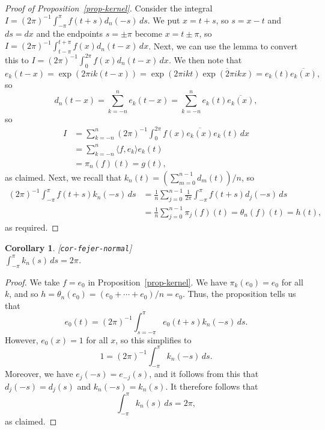 \documentclass{amsart}
\newcommand{\lbl}[1]{\label{#1}\textup{[\texttt{#1}]}\ \\}
\newcommand{\lbl}{\label}
\newcommand{\tht}       {\theta}
\newcommand{\ip}[1]     {\langle #1\rangle}
\newcommand{\ov}[1]     {\overline{#1}}
\renewcommand{\:}       {\colon}
\newtheorem{corollary}[theorem]{Corollary}
\theoremstyle{definition}
\begin{document}
\begin{proof}[Proof of Proposition~\ref{prop-kernel}]
 Consider the integral
 $I=(2\pi)^{-1}\int_{-\pi}^\pi f(t+s)d_n(-s)\,ds$.  We put
 $x=t+s$, so $s=x-t$ and $ds=dx$ and the endpoints
 $s=\pm\pi$ become $x=t\pm\pi$, so
 $I=(2\pi)^{-1}\int_{t-\pi}^{t+\pi}f(x)d_n(t-x)\,dx$.  Next,
 we can use the lemma to convert this to
 $I=(2\pi)^{-1}\int_0^{2\pi}f(x)d_n(t-x)\,dx$.  We then note
 that
 \[ e_k(t-x) = \exp(2\pi ik(t-x)) = 
     \exp(2\pi ikt) \ov{\exp(2\pi ikx)} = 
      e_k(t) \ov{e_k(x)},
 \]
 so
 \[ d_n(t-x) = \sum_{k=-n}^n e_k(t-x)
             = \sum_{k=-n}^n e_k(t) \ov{e_k(x)},
 \]
 so
 \begin{align*}
  I &=
    \sum_{k=-n}^n (2\pi)^{-1}\int_0^{2\pi}
       f(x)\ov{e_k(x)} e_k(t) \, dx \\
    &= \sum_{k=-n}^n \ip{f,e_k} e_k(t) \\
    &= \pi_n(f)(t) = g(t),
 \end{align*}
 as claimed.  Next, we recall that
 $k_n(t)=(\sum_{m=0}^{n-1}d_m(t))/n$, so
 \begin{align*}
  (2\pi)^{-1}\int_{-\pi}^{\pi} f(t+s)k_n(-s)\,ds 
   &= \frac{1}{n}\sum_{j=0}^{n-1}
   \frac{1}{2\pi}\int_{-\pi}^\pi f(t+s)d_j(-s)\,ds \\
   &= \frac{1}{n}\sum_{j=0}^{n-1}\pi_j(f)(t) 
    = \tht_n(f)(t) = h(t),
 \end{align*}
 as required.
\end{proof}

\begin{corollary}\lbl{cor-fejer-normal}
 $\int_{-\pi}^\pi k_n(s)\,ds=2\pi$.
\end{corollary}
\begin{proof}
 We take $f=e_0$ in Proposition~\ref{prop-kernel}.  We have
 $\pi_k(e_0)=e_0$ for all $k$, and so
 $h=\tht_n(e_0)=(e_0+\dotsb+e_0)/n=e_0$.  Thus, the
 proposition tells us that 
 \[ e_0(t) = (2\pi)^{-1}\int_{s=-\pi}^\pi e_0(t+s)k_n(-s)\,ds. \]
 However, $e_0(x)=1$ for all $x$, so this simplifies to
 \[ 1 = (2\pi)^{-1}\int_{-\pi}^\pi k_n(-s)\,ds. \]
 Moreover, we have $e_j(-s)=e_{-j}(s)$, and it follows from
 this that $d_j(-s)=d_j(s)$ and $k_n(-s)=k_n(s)$.  It
 therefore follows that 
 \[ \int_{-\pi}^\pi k_n(s)\,ds = 2\pi, \]
 as claimed.
\end{proof}
\end{document}
